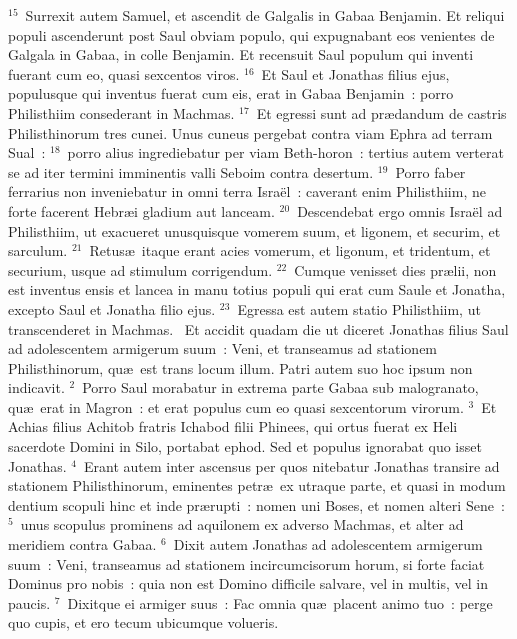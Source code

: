 ${}^{15}$~Surrexit autem Samuel, et ascendit de Galgalis in Gabaa Benjamin. Et reliqui populi ascenderunt post Saul obviam populo, qui expugnabant eos venientes de Galgala in Gabaa, in colle Benjamin. Et recensuit Saul populum qui inventi fuerant cum eo, quasi sexcentos viros.
${}^{16}$~Et Saul et Jonathas filius ejus, populusque qui inventus fuerat cum eis, erat in Gabaa Benjamin~: porro Philisthiim consederant in Machmas.
${}^{17}$~Et egressi sunt ad pr\ae dandum de castris Philisthinorum tres cunei. Unus cuneus pergebat contra viam Ephra ad terram Sual~:
${}^{18}$~porro alius ingrediebatur per viam Beth-horon~: tertius autem verterat se ad iter termini imminentis valli Seboim contra desertum.
${}^{19}$~Porro faber ferrarius non inveniebatur in omni terra Isra\"el~: caverant enim Philisthiim, ne forte facerent Hebr\ae i gladium aut lanceam.
${}^{20}$~Descendebat ergo omnis Isra\"el ad Philisthiim, ut exacueret unusquisque vomerem suum, et ligonem, et securim, et sarculum.
${}^{21}$~Retus\ae\ itaque erant acies vomerum, et ligonum, et tridentum, et securium, usque ad stimulum corrigendum.
${}^{22}$~Cumque venisset dies pr\ae lii, non est inventus ensis et lancea in manu totius populi qui erat cum Saule et Jonatha, excepto Saul et Jonatha filio ejus.
${}^{23}$~Egressa est autem statio Philisthiim, ut transcenderet in Machmas.
~\lettrine[lines=10,image=true,loversize=0.05,lraise=-0.03]{E}{}t accidit quadam die ut diceret Jonathas filius Saul ad adolescentem armigerum suum~: Veni, et transeamus ad stationem Philisthinorum, qu\ae\ est trans locum illum. Patri autem suo hoc ipsum non indicavit.
${}^{2}$~Porro Saul morabatur in extrema parte Gabaa sub malogranato, qu\ae\ erat in Magron~: et erat populus cum eo quasi sexcentorum virorum.
${}^{3}$~Et Achias filius Achitob fratris Ichabod filii Phinees, qui ortus fuerat ex Heli sacerdote Domini in Silo, portabat ephod. Sed et populus ignorabat quo isset Jonathas.
${}^{4}$~Erant autem inter ascensus per quos nitebatur Jonathas transire ad stationem Philisthinorum, eminentes petr\ae\ ex utraque parte, et quasi in modum dentium scopuli hinc et inde pr\ae rupti~: nomen uni Boses, et nomen alteri Sene~:
${}^{5}$~unus scopulus prominens ad aquilonem ex adverso Machmas, et alter ad meridiem contra Gabaa.
${}^{6}$~Dixit autem Jonathas ad adolescentem armigerum suum~: Veni, transeamus ad stationem incircumcisorum horum, si forte faciat Dominus pro nobis~: quia non est Domino difficile salvare, vel in multis, vel in paucis.
${}^{7}$~Dixitque ei armiger suus~: Fac omnia qu\ae\ placent animo tuo~: perge quo cupis, et ero tecum ubicumque volueris.
